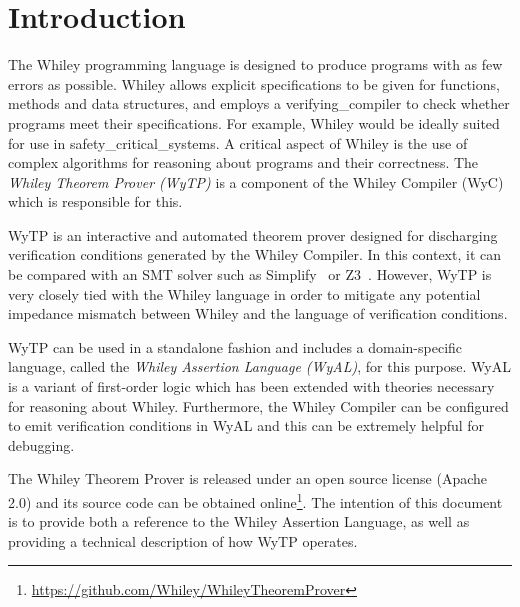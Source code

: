 \chapter{Introduction}

The Whiley programming language is designed to produce programs with
as few errors as possible.  Whiley allows explicit specifications to
be given for functions, methods and data structures, and employs a
\gls{verifying_compiler} to check whether programs meet their
specifications.  For example, Whiley would be ideally suited for use
in \gls{safety_critical_system}s.  A critical aspect of Whiley is the
use of complex algorithms for reasoning about programs and their
correctness.  The {\em Whiley Theorem Prover (WyTP)} is a component of
the Whiley Compiler (WyC) which is responsible for this.

WyTP is an interactive and automated theorem prover designed for
discharging verification conditions generated by the Whiley Compiler.
In this context, it can be compared with an SMT solver such as
Simplify~\cite{DNS05} or Z3~\cite{MB08}.  However, WyTP is very
closely tied with the Whiley language in order to mitigate any
potential impedance mismatch between Whiley and the language of
verification conditions.

WyTP can be used in a standalone fashion and includes a
domain-specific language, called the {\em Whiley Assertion Language
  (WyAL)}, for this purpose.  WyAL is a variant of first-order logic
which has been extended with theories necessary for reasoning about
Whiley.  Furthermore, the Whiley Compiler can be configured to emit
verification conditions in WyAL and this can be extremely helpful for
debugging.

The Whiley Theorem Prover is released under an open source license
(Apache 2.0) and its source code can be obtained
online\footnote{\url{https://github.com/Whiley/WhileyTheoremProver}}.
The intention of this document is to provide both a reference to the
Whiley Assertion Language, as well as providing a technical description
of how WyTP operates.

